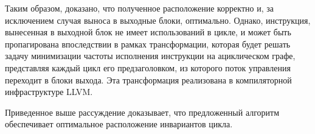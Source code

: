 Таким образом, доказано, что полученное расположение корректно и, за исключением случая выноса в выходные блоки, оптимально.
Однако, инструкция, вынесенная в выходной блок не имеет использований в цикле, и может быть пропагирована впоследствии в рамках трансформации, которая будет решать задачу минимизации частоты исполнения инструкции на ациклическом графе, представляя каждый цикл его предзаголовком, из которого поток управления переходит в блоки выхода.
Эта трансформация реализована в компиляторной инфраструктуре LLVM.

Приведенное выше рассуждение доказывает, что предложенный алгоритм обеспечивает оптимальное расположение инвариантов цикла.

\newpage
